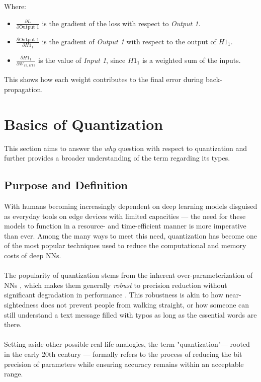 \noindent Where:
\begin{itemize}
    \item \( \frac{\partial L}{\partial \text{Output 1}} \) is the gradient of the loss with respect to \textit{Output 1}.
    \item \( \frac{\partial \text{Output 1}}{\partial H1_1} \) is the gradient of \textit{Output 1} with respect to the output of \( H1_1 \).
    \item \( \frac{\partial H1_1}{\partial W_{I1,H11}} \) is the value of \textit{Input 1}, since \( H1_1 \) is a weighted sum of the inputs.
\end{itemize}

\noindent This shows how each weight contributes to the final error during back-propagation.


\section{Basics of Quantization}
\label{sec:section2}
This section aims to answer the \textit{why} question with respect to quantization and further provides a broader understanding of the term regarding its types.

\subsection{Purpose and Definition}
\label{subsec:subsection1}
With humans becoming increasingly dependent on deep learning models disguised as everyday tools on edge devices with 
limited capacities — the need for these models to function in a resource- and 
time-efficient manner is more imperative than ever. Among the many ways to meet this need, 
quantization has become one of the most popular techniques used to reduce the computational 
and memory costs of deep NNs.
\\
\\
The popularity of quantization stems from the inherent over-parameterization of NNs \cite{gholami2021survey},
which makes them generally \textit{robust} to precision reduction without significant degradation in performance \cite{DBLP:journals/tcad/DuLCPTW15}.
This robustness is akin to how near-sightedness does not prevent people from walking straight,
or how someone can still understand a text message filled with typos as long as the essential words are there.
\\
\\
Setting aside other possible real-life analogies, the term "quantization"— rooted in the early 20th century \cite{gray1998quantization} — 
formally refers to the process of reducing the bit precision of parameters while ensuring accuracy remains within an acceptable range.

